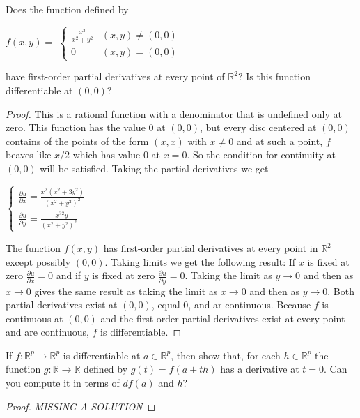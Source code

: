 \documentclass[12pt]{book}
\newcommand{\R}{\mathbb{R}}
\newenvironment{exercise}[2][Exercise]{\begin{trivlist}
\item[\hskip \labelsep {\bfseries #1}\hskip \labelsep {\bfseries #2.}]}{\end{trivlist}}
\begin{document}
\begin{exercise}{9.2.10} Does the function defined by \newline
  \begin{center}
  $f(x,y) = $
        $\begin{cases}
          \frac{x^3}{x^2 + y^2} & (x,y) \neq (0,0) \\
          0  & (x,y) = (0,0)
         \end{cases}$
    \end{center}
have first-order partial derivatives at every point of $\R^2$? Is this function differentiable at $(0,0)$? 

\begin{proof}
This is a rational function with a denominator that is undefined only at zero. This function has the value 0 at $(0,0)$, but every disc centered at $(0,0)$ contains of the points of the form $(x,x)$ with $x \neq 0$ and at such a point, $f$ beaves like $x/2$ which has value 0 at $x=0$. So the condition for continuity at $(0,0)$ will be satisfied. Taking the partial derivatives we get
\begin{center}
  $\begin{cases}
    \frac{\partial u}{\partial x} = \frac{x^2(x^2 + 3y^2)}{(x^2 + y^2)^2} \\
    \frac{\partial u}{\partial y} = \frac{-x^32y}{(x^2+y^2)^2}
  \end{cases}$
\end{center}
The function $f(x,y)$ has first-order partial derivatives at every point in $\R^2$ except possibly $(0,0)$. Taking limits we get the following result:\newline
If $x$ is fixed at zero $\frac{\partial u}{\partial x} = 0$ and if $y$ is fixed at zero $\frac{\partial u}{\partial y} = 0$. Taking the limit as $y \to 0$ and then as $x \to 0$ gives the same result as taking the limit as $x \to 0$ and then as $y \to 0$. Both partial derivatives exist at $(0,0)$, equal $0$, and ar continuous. Because $f$ is continuous at $(0,0)$ and the first-order partial derivatives exist at every point and are continuous, $f$ is differentiable. 
\end{proof}
\end{exercise}


\begin{exercise}{9.2.11}
	If $f : \R^p \to \R^p$ is differentiable at $a \in \R^p$, then show that, for each $h \in \R^p$ the function $g: \R \to \R$ defined by $g(t) = f(a + t h)$ has a derivative at $t = 0$. Can you compute it in terms of $d f(a) $ and $h$?

	\begin{proof}
	\emph{MISSING A SOLUTION}
	\end{proof}
\end{exercise}
\end{document}
